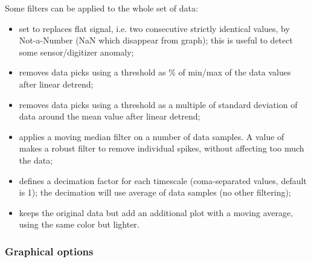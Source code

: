 Some filters can be applied to the whole set of data:
\begin{itemize}
	\item {} set to  replaces flat signal, i.e. two consecutive strictly identical values, by Not-a-Number (NaN which disappear from graph); this is useful to detect some sensor/digitizer anomaly;
	\item {} removes data picks using a threshold as \% of min/max of the data values after linear detrend;
	\item {} removes data picks using a threshold as a multiple of standard deviation of data around the mean value after linear detrend;
	\item {} applies a moving median filter on a number of data samples. A value of  makes a robust filter to remove individual spikes, without affecting too much the data;
	\item {} defines a decimation factor for each timescale (coma-separated values, default is 1); the decimation will use average of data samples (no other filtering);
	\item {} keeps the original data but add an additional plot with a moving average, using the same color but lighter.
\end{itemize}


\subsubsection{Graphical options}

